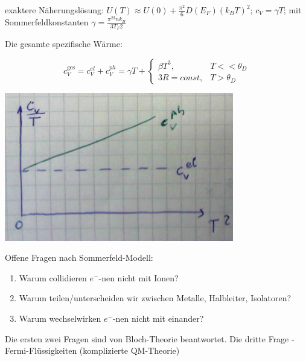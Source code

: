 exaktere Näherungslösung:  \(U(T) \approx U(0) +\frac{\pi^2}{6}D(E_F)(k_BT)^2\); \(c_V=\gamma T\); mit Sommerfeldkonstanten \(\gamma = \frac{\pi^23nk_B}{3T_F2}\)

Die gesamte spezifische Wärme:

\[c_V^{\text{ges}} = c_V^{el}+c_V^{ph} = \gamma T + \begin{cases}
 \beta T^3,  & T<<\theta_D\\
 3R=const,  & T>\theta_D
\end{cases}\]


\includegraphics[width=0.75\textwidth]{kap06_30.png}

Offene Fragen nach Sommerfeld-Modell:

\begin{enumerate}
\item Warum collidieren \(e^-\)-nen nicht mit Ionen?
\item Warum teilen/unterscheiden wir zwischen Metalle, Halbleiter, Isolatoren?
\item Warum wechselwirken  \(e^-\)-nen nicht mit einander?
\end{enumerate}

Die ersten zwei Fragen sind von Bloch-Theorie beantwortet. Die dritte Frage - Fermi-Flüssigkeiten (komplizierte QM-Theorie)






